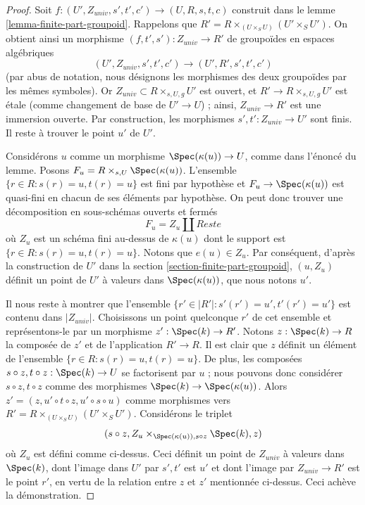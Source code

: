\begin{proof}
Soit $f : (U', Z_{univ}, s', t', c') \to (U, R, s, t, c)$ construit dans le
lemme \ref{lemma-finite-part-groupoid}.
Rappelons que $R' = R \times_{(U \times_S U)} (U' \times_S U')$.
On obtient ainsi un morphisme $(f, t', s') : Z_{univ} \to R'$ de groupoïdes
en espaces algébriques
$$
(U', Z_{univ}, s', t', c') \to (U', R', s', t', c')
$$
(par abus de notation, nous désignons les morphismes des deux groupoïdes
par les mêmes symboles). Or $Z_{univ} \subset R \times_{s, U, g} U'$ est ouvert,
et $R' \to R \times_{s, U, g} U'$ est \'etale (comme changement de base
de $U' \to U$) ; ainsi, $Z_{univ} \to R'$ est une immersion ouverte.
Par construction, les morphismes $s', t' : Z_{univ} \to U'$ sont finis.
Il reste à trouver le point $u'$ de $U'$.

\medskip\noindent
Considérons $u$ comme un morphisme $\Spec(\kappa(u)) \to U$, comme dans
l'énoncé du lemme. Posons $F_u = R \times_{s, U} \Spec(\kappa(u))$.
L'ensemble $\{r \in R : s(r) = u, t(r) = u\}$ est fini par hypothèse
et $F_u \to \Spec(\kappa(u))$ est quasi-fini en chacun
de ses éléments par hypothèse. On peut donc trouver une décomposition en
sous-schémas ouverts et fermés
$$
F_u = Z_u \amalg Reste
$$
où $Z_u$ est un schéma fini au-dessus de $\kappa(u)$ dont le support est
$\{r \in R : s(r) = u, t(r) = u\}$. Notons que $e(u) \in Z_u$.
Par conséquent, d'après la construction de $U'$ dans la
section \ref{section-finite-part-groupoid},
$(u, Z_u)$ définit un point de $U'$ à valeurs dans
$\Spec(\kappa(u))$, que nous notons $u'$.

\medskip\noindent
Il nous reste à montrer que l'ensemble
$\{r' \in |R'| : s'(r') = u', t'(r') = u'\}$
est contenu dans $|Z_{univ}|$.
Choisissons un point quelconque $r'$ de cet ensemble et représentons-le par
un morphisme $z' : \Spec(k) \to R'$. Notons $z : \Spec(k) \to R$
la composée de $z'$ et de l'application $R' \to R$.
Il est clair que $z$ définit un élément de l'ensemble
$\{r \in R : s(r) = u, t(r) = u\}$.
De plus, les composées $s \circ z, t \circ z : \Spec(k) \to U$
se factorisent par $u$ ; nous pouvons donc considérer $s \circ z, t \circ z$
comme des morphismes $\Spec(k) \to \Spec(\kappa(u))$. Alors
$z' = (z, u' \circ t \circ z, u'\circ s \circ u)$ comme morphismes vers
$R' = R \times_{(U \times_S U)} (U' \times_S U')$.
Considérons le triplet
$$
(s \circ z, Z_u \times_{\Spec(\kappa(u)), s \circ z} \Spec(k), z)
$$
où $Z_u$ est défini comme ci-dessus. Ceci définit un point de $Z_{univ}$
à valeurs dans $\Spec(k)$, dont l'image dans $U'$ par $s', t'$ est $u'$ et
dont l'image par
$Z_{univ} \to R'$ est le point $r'$, en vertu de la relation entre
$z$ et $z'$ mentionnée ci-dessus.
Ceci achève la démonstration.
\end{proof}

